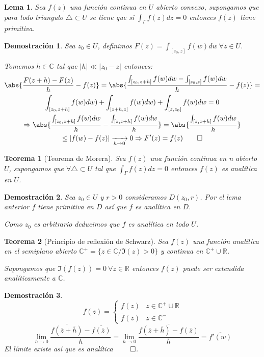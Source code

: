 \documentclass[12pt]{book}
\newtheorem{theorem}{Teorema}[chapter]
\newtheorem*{dem}{Demostración}
\newtheorem{lema}{Lema}[chapter]
\newcommand{\R}{\mathbb{R}}
\newcommand{\C}{\mathbb{C}}
\begin{document}
\begin{lema}
Sea $f(z)$ una función continua en $U$ abierto convexo, supongamos que para todo triangulo $\triangle \subset U$ se tiene que si $\int_\Gamma f(z)dz =0$ entonces $f(z)$ tiene primitiva.
\end{lema}

\begin{dem}
Sea $z_0 \in U$, definimos $F(z) = \int_{[z_0,z]} f(w)dw \ \forall z\in U$.

Tomemos $h \in \C$ tal que $|h| \ll |z_0-z|$ entonces:
\begin{multline*}
\abs{ \frac{F(z+h)-F(z)}{h}-f(z)} = \abs{ \frac{\int_{[z_0,z+h]}f(w)dw -\int_{[z_0,z]}f(w)dw}{h}-f(z)} =\\
 \int_{[z_0,z+h]}f(w)dw) + \int_{[z+h,z]}f(w)dw)+\int_{[z,z_0]}f(w)dw = 0\\
\Rightarrow \abs{ \frac{\int_{[z_0,z+h]}f(w)dw}{h} - \frac{\int_{[z,z+h]}f(w)dw}{h}} = \abs{ \frac{\int_{[z,z+h]}f(w)dw}{h}} \\
\leq |f(w)-f(z)| \xrightarrow[h\to 0]{} 0 \Rightarrow F'(z) = f(z) \qed
\end{multline*}
\end{dem}


\begin{theorem}[Teorema de Morera]
Sea $f(z)$ una función continua en n abierto $U$, supongamos que $\forall \triangle \subset U$ tal que $\int_\Gamma f(z)dz =0$ entonces $f(z)$ es analítica en $U$.
\end{theorem}

\begin{dem}
Sea $z_0\in U$ y $r>0$ consideramos $D(z_0,r)$. Por el lema anterior $f$ tiene primitiva en $D$ así que $f$ es analítica en $D$.

Como $z_0$ es arbitrario deducimos que $f$ es analítica en todo $U$.
\end{dem}

\begin{theorem}[Principio de reflexión de Schwarz]
Sea $f(z)$ una función analítica en el semiplano abierto $\C^+ = \{z\in\C / \Im(z) >0\}$ y continua en $\C^+ \cup \R$.

Supongamos que $\Im(f(z)) = 0\ \forall z\in \R$ entonces $f(z)$ puede ser extendida analíticamente a $\C$.
\end{theorem}

\begin{dem}
$$
f(z) = \left\{\begin{array}{cc} f(z) &z\in \C^+ \cup \R \\
						\overline{f}(\overline{z}) &z\in\C^-
		\end{array}\right.
$$$$
\lim_{h\to 0} \frac{\overline{f(\overline{z}+\overline{h})}-\overline{f(\overline{z})}}{h} = \lim_{h\to 0} \frac{\overline{f(\overline{z}+\overline{h})-f(\overline{z})}}{h} = \overline{f'(w)} 
$$
El límite existe así que es analítica $\qed$.
\end{dem}
\end{document}
